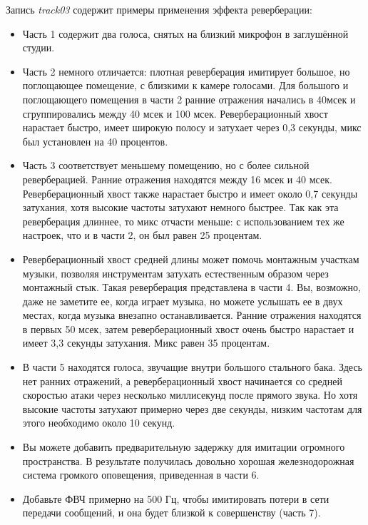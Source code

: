 \documentclass[oneside, final, 14pt]{extreport}
\begin{document}
Запись \emph{track03} содержит примеры применения эффекта реверберации:
\begin{itemize}
  \item Часть 1 содержит два голоса, снятых на близкий микрофон в заглушённой студии.
  \item Часть 2 немного отличается: плотная реверберация имитирует большое, но поглощающее помещение, с близкими к камере голосами. Для большого и поглощающего помещения в части 2 ранние отражения начались в 40мсек и сгруппировались между 40 мсек и 100 мсек. Реверберационный хвост нарастает быстро, имеет широкую полосу и затухает через 0,3 секунды, микс был установлен на 40 процентов.
  \item Часть 3 соответствует меньшему помещению, но с более сильной реверберацией. Ранние отражения находятся между 16 мсек и 40 мсек. Реверберационный хвост также нарастает быстро и имеет около 0,7 секунды затухания, хотя высокие частоты затухают немного быстрее. Так как эта реверберация длиннее, то микс отчасти меньше: с использованием тех же настроек, что и в части 2, он был равен 25 процентам.
  \item Реверберационный хвост средней длины может помочь монтажным участкам музыки, позволяя инструментам затухать естественным образом через монтажный стык. Такая реверберация представлена в части 4. Вы, возможно, даже не заметите ее, когда играет музыка, но можете услышать ее в двух местах, когда музыка внезапно останавливается. Ранние отражения находятся в первых 50 мсек, затем реверберационный хвост очень быстро нарастает и имеет 3,3 секунды затухания. Микс равен 35 процентам.
  \item В части 5 находятся голоса, звучащие внутри большого стального бака. Здесь нет ранних отражений, а реверберационный хвост начинается со средней скоростью атаки через несколько миллисекунд после прямого звука. Но хотя высокие частоты затухают примерно через две секунды, низким частотам для этого необходимо около 10 секунд.
  \item Вы можете добавить предварительную задержку для имитации огромного пространства. В результате получилась довольно хорошая железнодорожная система громкого оповещения, приведенная в части 6.
  \item Добавьте ФВЧ примерно на 500 Гц, чтобы имитировать потери в сети передачи сообщений, и она будет близкой к совершенству (часть 7). 
\end{itemize}
\end{document}

